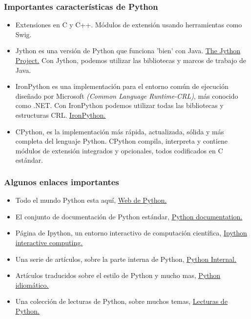 \documentclass[10pt]{beamer}
\begin{document}
\begin{frame}[fragile]
\frametitle{Importantes caracter\'isticas de Python}
\begin{itemize}

\item Extensiones en C y C++. M\'odulos de extensi\'on usando herramientas como Swig.
\item Jython es una versi\'on de Python que funciona 'bien' con Java. \href{http://www.jython.org/Project/}{\underline{The Jython Project.}} Con Jython, podemos utilizar las bibliotecas y marcos de trabajo de Java.
\item IronPython es una implementaci\'on para el entorno com\'un de ejecuci\'on dise\~nado por Microsoft \textit{(Common Language Runtime-CRL)}, m\'as conocido como .NET. Con IronPython podemos utilizar todas las bibliotecas y estructuras CRL. \href{http://ironpython.net/}{\underline{IronPython.}}
\item CPython, es la implementaci\'on m\'as r\'apida, actualizada, s\'olida y m\'as completa del lenguaje  Python. CPython compila, interpreta y contiene m\'odulos de extensi\'on integrados y opcionales, todos codificados en C est\'andar.
\end{itemize}
\end{frame}

\begin{frame}[fragile]
\frametitle{Algunos enlaces importantes}

\begin{itemize}
\item Todo el mundo Python esta aqu\'i, \href{http://www.python.org}{\underline{Web de Python.}}
\item El conjunto de documentaci\'on de Python est\'andar, \href{http://www.python.org/doc/}{\underline{Python documentation.}} 
\item P\'agina de Ipython, un entorno interactivo de computaci\'on cient\'ifica, 
\href{http://ipython.org/}{\underline{Ipython interactive computing.}}
\item Una serie de art\'iculos, sobre la parte interna de Python, \href{http://tech.blog.aknin.name/2010/04/02/pythons-innards-introduction/}{\underline{Python Internal.}}
\item Art\'iculos traducidos sobre el estilo de Python y mucho mas, \href{http://mundogeek.net/traducidos/}{\underline{Python idiom\'atico.}}
\item Una colecci\'on de lecturas de Python, sobre muchos temas, \href{http://jessenoller.com/good-to-great-python-reads/}{\underline{Lecturas de Python.}}

\end{itemize}


\end{frame}
\end{document}
